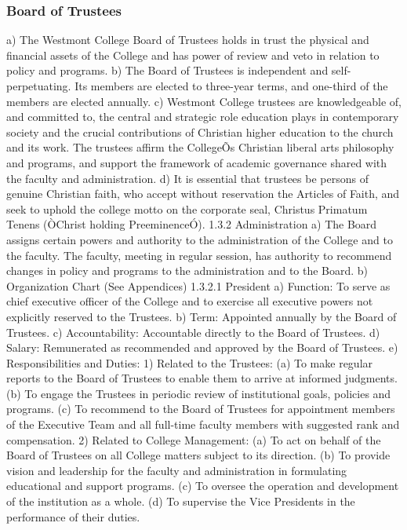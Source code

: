 \documentclass[letterpaper, 11pt]{article}
\begin{document}
\subsubsection{Board of Trustees}
a) The Westmont College Board of Trustees holds in trust the physical and financial assets of the College and has power of review and veto in relation to policy and programs.
b) The Board of Trustees is independent and self-perpetuating. Its members are elected to three-year terms, and one-third of the members are elected annually.
c) Westmont College trustees are knowledgeable of, and committed to, the central and strategic role education plays in contemporary society and the crucial contributions of Christian higher education to the church and its work. The trustees affirm the CollegeÕs Christian liberal arts philosophy and programs, and support the framework of academic governance shared with the faculty and administration.
d) It is essential that trustees be persons of genuine Christian faith, who accept without reservation the Articles of Faith, and seek to uphold the college motto on the corporate seal, Christus Primatum Tenens (ÒChrist holding PreeminenceÓ).
1.3.2 Administration
a) The Board assigns certain powers and authority to the administration of the College and to the faculty. The faculty, meeting in regular session, has authority to recommend changes in policy and programs to the administration and to the Board.
b) Organization Chart (See Appendices)
1.3.2.1 President
a) Function: To serve as chief executive officer of the College and to exercise all executive powers not explicitly reserved to the Trustees.
b) Term: Appointed annually by the Board of Trustees.
c) Accountability: Accountable directly to the Board of Trustees.
d) Salary: Remunerated as recommended and approved by the Board of Trustees.
e) Responsibilities and Duties:
1) Related to the Trustees:
(a) To make regular reports to the Board of Trustees to enable them to arrive at informed judgments.
(b) To engage the Trustees in periodic review of institutional goals, policies and programs.
(c) To recommend to the Board of Trustees for appointment members of the Executive Team and all full-time faculty members with suggested rank and compensation.
2) Related to College Management:
(a) To act on behalf of the Board of Trustees on all College matters subject to its direction.
(b) To provide vision and leadership for the faculty and administration in formulating educational and support programs.
(c) To oversee the operation and development of the institution as a whole.
(d) To supervise the Vice Presidents in the performance of their duties.
\end{document}
